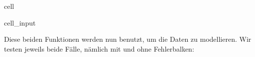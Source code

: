 \documentclass[letterpaper,10pt,english]{jupyterBook}
\begin{document}
\begin{sphinxuseclass}{cell}\begin{sphinxVerbatimInput}

\begin{sphinxuseclass}{cell_input}
\begin{sphinxVerbatim}[commandchars=\\\{\}]
    
       

   
         

   
       
\end{sphinxVerbatim}

\end{sphinxuseclass}\end{sphinxVerbatimInput}

\end{sphinxuseclass}
\sphinxAtStartPar
Diese beiden Funktionen werden nun benutzt, um die Daten zu modellieren. Wir testen jeweils beide Fälle, nämlich mit und ohne Fehlerbalken:
\end{document}

